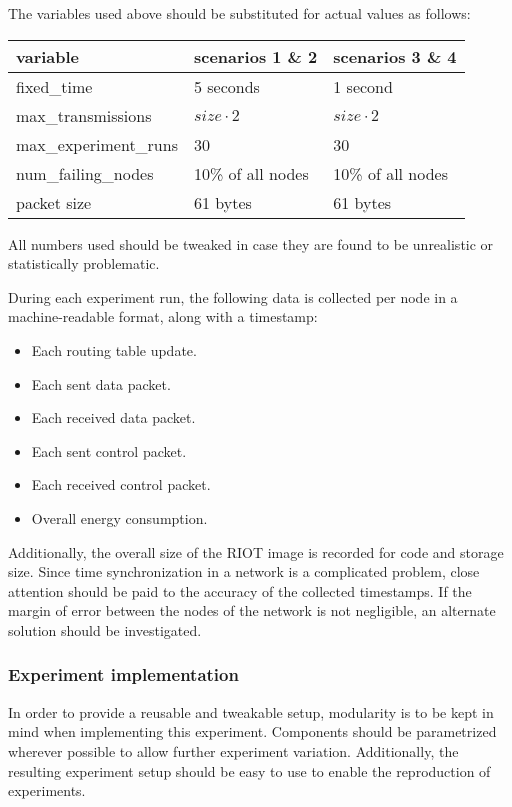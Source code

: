 \documentclass{acm_proc_article-sp}
\begin{document}
The variables used above should be substituted for actual values as follows:

\begin{tabularx}{\linewidth}{l | l | l}
  variable & scenarios 1 \& 2 & scenarios 3 \& 4  \\
  \hline
  fixed\_time & 5 seconds & 1 second \\ %
  max\_transmissions & $size \cdot 2$ & $size \cdot 2$ \\
  max\_experiment\_runs & 30 & 30 \\
  num\_failing\_nodes & 10\% of all nodes & 10\% of all nodes \\
  packet size & 61 bytes & 61 bytes
\end{tabularx}

All numbers used should be tweaked in case they are found to be unrealistic or statistically problematic.

During each experiment run, the following data is collected per node in a machine-readable format, along with a timestamp:
\begin{itemize}[noitemsep]
\item Each routing table update. %
\item Each sent data packet.
\item Each received data packet.
\item Each sent control packet.
\item Each received control packet.
\item Overall energy consumption.
\end{itemize}
Additionally, the overall size of the RIOT image is recorded for code and storage size.
Since time synchronization in a network is a complicated problem, close attention should be paid to the accuracy of the collected timestamps. If the margin of error between the nodes of the network is not negligible, an alternate solution should be investigated.

\subsubsection{Experiment implementation}
\label{subsec:implementation}
In order to provide a reusable and tweakable setup, modularity is to be kept in mind when implementing this experiment. Components should be parametrized wherever possible to allow further experiment variation. Additionally, the resulting experiment setup should be easy to use to enable the reproduction of experiments.
\end{document}
